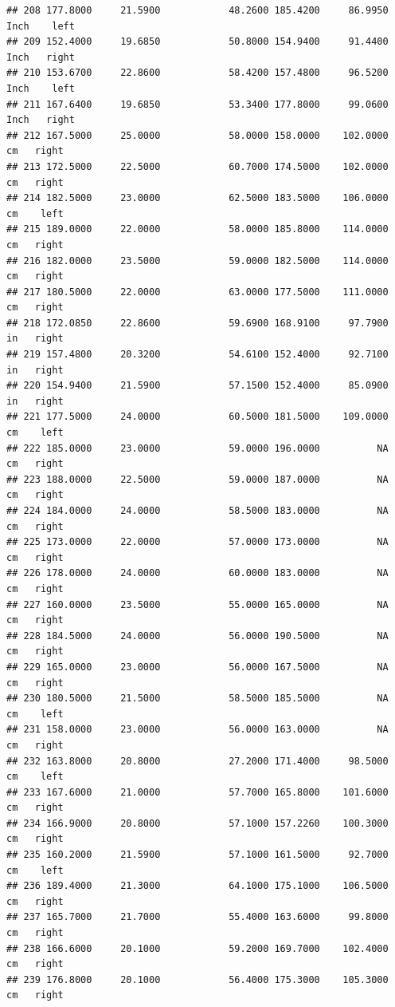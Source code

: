 \documentclass[]{article}
\begin{document}
\begin{verbatim}
## 208 177.8000     21.5900            48.2600 185.4200     86.9950   Inch    left
## 209 152.4000     19.6850            50.8000 154.9400     91.4400   Inch   right
## 210 153.6700     22.8600            58.4200 157.4800     96.5200   Inch    left
## 211 167.6400     19.6850            53.3400 177.8000     99.0600   Inch   right
## 212 167.5000     25.0000            58.0000 158.0000    102.0000     cm   right
## 213 172.5000     22.5000            60.7000 174.5000    102.0000     cm   right
## 214 182.5000     23.0000            62.5000 183.5000    106.0000     cm    left
## 215 189.0000     22.0000            58.0000 185.8000    114.0000     cm   right
## 216 182.0000     23.5000            59.0000 182.5000    114.0000     cm   right
## 217 180.5000     22.0000            63.0000 177.5000    111.0000     cm   right
## 218 172.0850     22.8600            59.6900 168.9100     97.7900     in   right
## 219 157.4800     20.3200            54.6100 152.4000     92.7100     in   right
## 220 154.9400     21.5900            57.1500 152.4000     85.0900     in   right
## 221 177.5000     24.0000            60.5000 181.5000    109.0000     cm    left
## 222 185.0000     23.0000            59.0000 196.0000          NA     cm   right
## 223 188.0000     22.5000            59.0000 187.0000          NA     cm   right
## 224 184.0000     24.0000            58.5000 183.0000          NA     cm   right
## 225 173.0000     22.0000            57.0000 173.0000          NA     cm   right
## 226 178.0000     24.0000            60.0000 183.0000          NA     cm   right
## 227 160.0000     23.5000            55.0000 165.0000          NA     cm   right
## 228 184.5000     24.0000            56.0000 190.5000          NA     cm   right
## 229 165.0000     23.0000            56.0000 167.5000          NA     cm   right
## 230 180.5000     21.5000            58.5000 185.5000          NA     cm    left
## 231 158.0000     23.0000            56.0000 163.0000          NA     cm   right
## 232 163.8000     20.8000            27.2000 171.4000     98.5000     cm    left
## 233 167.6000     21.0000            57.7000 165.8000    101.6000     cm   right
## 234 166.9000     20.8000            57.1000 157.2260    100.3000     cm   right
## 235 160.2000     21.5900            57.1000 161.5000     92.7000     cm    left
## 236 189.4000     21.3000            64.1000 175.1000    106.5000     cm   right
## 237 165.7000     21.7000            55.4000 163.6000     99.8000     cm   right
## 238 166.6000     20.1000            59.2000 169.7000    102.4000     cm   right
## 239 176.8000     20.1000            56.4000 175.3000    105.3000     cm   right

\end{verbatim}
\end{document}
